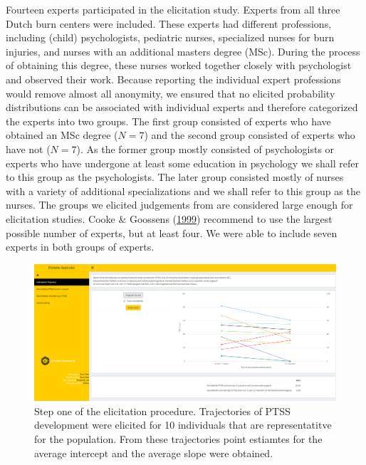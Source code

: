 \documentclass[openright,titlepage,12pt,a4paper]{book}
\begin{document}
Fourteen experts participated in the elicitation study. Experts from all three Dutch burn centers were included. These experts had different professions, including (child) psychologists, pediatric nurses, specialized nurses for burn injuries, and nurses with an additional masters degree (MSc). During the process of obtaining this degree, these nurses worked together closely with psychologist and observed their work. Because reporting the individual expert professions would remove almost all anonymity, we ensured that no elicited probability distributions can be associated with individual experts and therefore categorized the experts into two groups. The first group consisted of experts who have obtained an MSc degree (\(N=7\)) and the second group consisted of experts who have not (\(N=7\)). As the former group mostly consisted of psychologists or experts who have undergone at least some education in psychology we shall refer to this group as the psychologists. The later group consisted mostly of nurses with a variety of additional specializations and we shall refer to this group as the nurses. The groups we elicited judgements from are considered large enough for elicitation studies. Cooke \& Goossens (\protect\hyperlink{ref-cooke_procedures_1999}{1999}) recommend to use the largest possible number of experts, but at least four. We were able to include seven experts in both groups of experts.

\newpage

\begin{figure}

{\centering \includegraphics[width=0.9\linewidth]{figures/chapter_6/Figure2b} 

}

\caption{Step one of the elicitation procedure. Trajectories of PTSS development were elicited for 10 individuals that are representatitve for the population. From these trajectories point estiamtes for the average intercept and the average slope were obtained.}\label{fig:ch06fig2}
\end{figure}
\end{document}
